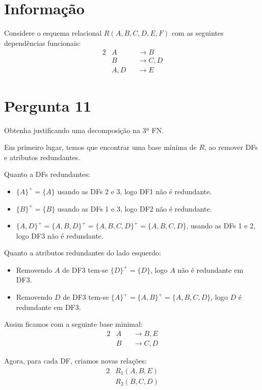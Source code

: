 \documentclass[type=normal, year=2014/15]{bdad_exam}
\begin{document}
{\section*{Informação}
Considere o esquema relacional $R(A,B,C,D,E,F)$ com as seguintes dependências funcionais:
\begin{alignat*}{2}
    & A    && \rightarrow B    \\
    & B    && \rightarrow C, D \\
    & A, D && \rightarrow E
\end{alignat*}

\section{Pergunta 11}
Obtenha justificando uma decomposição na 3ª FN.

\ansseparator

Em primeiro lugar, temos que encontrar uma base mínima de $R$, ao remover DFs e atributos redundantes.

Quanto a DFs redundantes:
\begin{itemize}
    \item $\{A\}^+ = \{A\}$ usando as DFs 2 e 3, logo DF1 não é redundante.
    \item $\{B\}^+ = \{B\}$ usando as DFs 1 e 3, logo DF2 não é redundante.
    \item $\{A,D\}^+ = \{A,B,D\}^+ = \{A,B,C,D\}^+ = \{A,B,C,D\}$, usando as DFs 1 e 2, logo DF3 não é redundante.
\end{itemize}
Quanto a atributos redundantes do lado esquerdo:
\begin{itemize}
    \item Removendo $A$ de DF3 tem-se $\{D\}^+ = \{D\}$, logo $A$ não é redundante em DF3.
    \item Removendo $D$ de DF3 tem-se $\{A\}^+ = \{A,B\}^+ = \{A,B,C,D\}$, logo $D$ é redundante em DF3.
\end{itemize}
Assim ficamos com a seguinte base minimal:
\begin{alignat*}{2}
    & A && \rightarrow B, E \\
    & B && \rightarrow C, D
\end{alignat*}

Agora, para cada DF, criamos novas relações:
\begin{alignat*}{2}
    & R_1 (A, B, E) \\
    & R_2 (B, C, D)
\end{alignat*}

}
\end{document}

